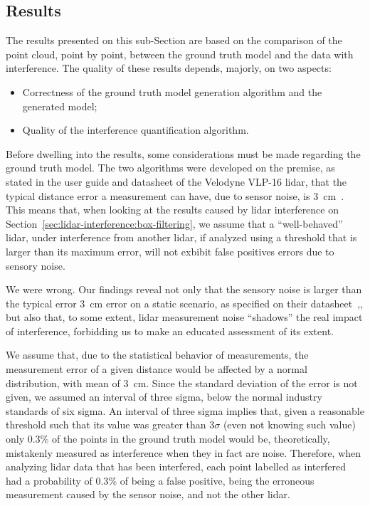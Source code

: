 \subsection{Results}
\label{subsec:lidar-interference:point-to-point-analysis-results}
The results presented on this sub-Section are based on the comparison of the point cloud, point by point, between the ground truth model and the data with interference. The quality of these results depends, majorly, on two aspects:

\begin{itemize}
\item Correctness of the ground truth model generation algorithm and the generated model;
\item Quality of the interference quantification algorithm.
\end{itemize}

Before dwelling into the results, some considerations must be made regarding the ground truth model. The two algorithms were developed on the premise, as stated in the user guide and datasheet of the Velodyne VLP-16 \ac{lidar}, that the typical distance error a measurement can have, due to sensor noise, is \SI{3}{\centi\meter}~\cite{VLP16}. This means that, when looking at the results caused by \ac{lidar} interference on Section~\ref{sec:lidar-interference:box-filtering}, we assume that a ``well-behaved'' \ac{lidar}, under interference from another \ac{lidar}, if analyzed using a threshold that is larger than its maximum error, will not exbibit false positives errors due to sensory noise.

We were wrong. Our findings reveal not only that the sensory noise is larger than the typical error \SI{3}{\centi\meter} error on a static scenario, as specified on their datasheet~,\cite{VLP16}, but also that, to some extent, \ac{lidar} measurement noise ``shadows'' the real impact of interference, forbidding us to make an educated assessment of its extent.

We assume that, due to the statistical behavior of measurements, the measurement error of a given distance would be affected by a normal distribution, with mean of \SI{3}{\centi\meter}. Since the standard deviation of the error is not given, we assumed an interval of three sigma, below the normal industry standards of six sigma\citeneeded. An interval of three sigma implies that, given a reasonable threshold such that its value was greater than $3\sigma$ (even not knowing such value) only 0.3\% of the points in the ground truth model would be, theoretically, mistakenly measured as interference when they in fact are noise. Therefore, when analyzing \ac{lidar} data that has been interfered, each point labelled as interfered had a probability of $0.3\%$ of being a false positive, being the erroneous measurement caused by the sensor noise, and not the other \ac{lidar}.

